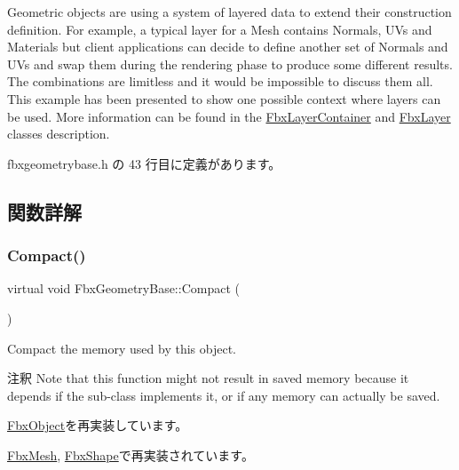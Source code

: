 Geometric objects are using a system of layered data to extend their construction definition. For example, a typical layer for a Mesh contains Normals, U\+Vs and Materials but client applications can decide to define another set of Normals and U\+Vs and swap them during the rendering phase to produce some different results. The combinations are limitless and it would be impossible to discuss them all. This example has been presented to show one possible context where layers can be used. More information can be found in the \hyperlink{class_fbx_layer_container}{Fbx\+Layer\+Container} and \hyperlink{class_fbx_layer}{Fbx\+Layer} classes description. 

 fbxgeometrybase.\+h の 43 行目に定義があります。



\subsection{関数詳解}
\mbox{\label{class_fbx_geometry_base_a66146155ecad4e6f6f2e8cf52e0340f6}} 
\subsubsection{\texorpdfstring{Compact()}{Compact()}}
{\footnotesize\ttfamily virtual void Fbx\+Geometry\+Base\+::\+Compact (\begin{DoxyParamCaption}{ }\end{DoxyParamCaption})\hspace{0.3cm}{\ttfamily [virtual]}}

Compact the memory used by this object. \begin{DoxyRemark}{注釈}
Note that this function might not result in saved memory because it depends if the sub-\/class implements it, or if any memory can actually be saved. 
\end{DoxyRemark}


\hyperlink{class_fbx_object_a2720f16a08150d162242b0c59f58c3dc}{Fbx\+Object}を再実装しています。



\hyperlink{class_fbx_mesh_a05ca6a8fbd028777c91931ce6edf4b19}{Fbx\+Mesh}, \hyperlink{class_fbx_shape_a9c3c948d3646bf78472164860ad11d65}{Fbx\+Shape}で再実装されています。

\mbox{\label{class_fbx_geometry_base_a6c27b53ff81cdcbe4f6da4b1acfd4375}} 
